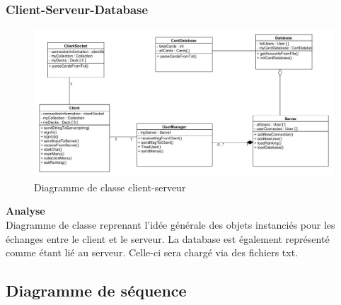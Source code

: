 \subsubsection{Client-Serveur-Database}
{
\begin{figure}[H]
    \includegraphics[width=1\textwidth,height=1\textwidth]{Images/classDiagram2.jpg}
    \caption{\label{Class Diagram Partie}Diagramme de classe client-serveur}
\end{figure}
\noindent\textbf{Analyse}\\
Diagramme de classe reprenant l'idée générale des objets instanciés pour les échanges entre le client et le serveur. La database est également représenté comme étant lié au serveur. Celle-ci sera chargé via des fichiers txt.
}
\subsection {Diagramme de séquence}
